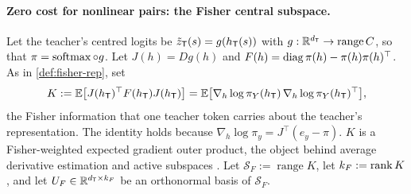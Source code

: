 \paragraph{Zero cost for nonlinear pairs: the Fisher central subspace.}
Let the teacher's centred logits be $\tilde z_{\mathsf{T}}(s)=g(h_{\mathsf{T}}(s))$ with $g:\mathbb{R}^{d_{\mathsf{T}}}\to\operatorname{range}C$, so that
$\pi=\operatorname{softmax}\circ g$. Let $J(h)=Dg(h)$ and $F(h)=\operatorname{diag}\pi(h)-\pi(h)\pi(h)^\top$. As in \cref{def:fisher-rep}, set
\[
K:=\mathbb{E}\big[J(h_{\mathsf{T}})^\top F(h_{\mathsf{T}})J(h_{\mathsf{T}})\big]=\mathbb{E}\big[\nabla_h\log\pi_Y(h_{\mathsf{T}})\,\nabla_h\log\pi_Y(h_{\mathsf{T}})^\top\big],
\]
the Fisher information that one teacher token carries about the teacher's representation. The identity holds because
$\nabla_h\log\pi_y=J^\top(e_y-\pi)$. $K$ is a Fisher-weighted expected gradient outer product, the object behind average
derivative estimation and active subspaces \citep{samarov1993exploring,constantine2014active}. Let
$\mathcal S_F:=\operatorname{range}K$, let $k_F:=\operatorname{rank} K$, and let $U_F\in\mathbb{R}^{d_{\mathsf{T}}\times k_F}$ be an orthonormal basis of $\mathcal S_F$.

